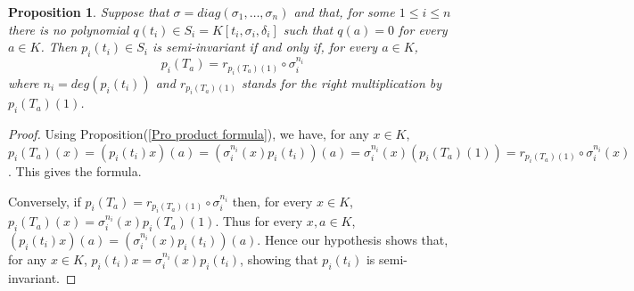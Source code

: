 \documentclass[12pt,a4paper]{article}
\newtheorem{proposition}[theorem]{Proposition}
\newtheorem{remarks}[theorem]{Remarks}
\newcommand{\de}{\delta}
\newcommand{\si}{\sigma}
\newcommand{\ut}{\underline{t}}
\begin{document}
		
	
	\begin{proposition} \label{Pro semi invarent and right multiplication}
				Suppose that $\sigma=diag(\sigma_1,\dots, \sigma_n)$ and that, for some $1\le i \le n$ there is no polynomial $q(t_i)\in S_i=K[t_i,\sigma_i,\delta_i]$ such that $q(a)=0$ for every $a\in K$.  Then $p_i(t_i)\in S_i$ is semi-invariant if and only if, for every $a\in K$,  
		$$
		p_i(T_a)=r_{p_i(T_a)(1)}\circ \sigma_i^{n_i}
		$$
		where $n_i=deg (p_i(t_i))$ and $r_{p_i(T_a)(1)}$ stands for the right multiplication by $p_i(T_a)(1)$.
	\end{proposition}
	\begin{proof}
		Using Proposition(\ref{Pro product formula}), we have, for any $x\in K$, $p_i(T_a)(x)= 
		(p_i(t_i)x)(a)=(\sigma_i^{n_i}(x)p_i(t_i))(a)
		=\sigma_i^{n_i}(x)(p_i(T_a)(1))=r_{p_i(T_a)(1)}\circ \sigma_i^{n_i}(x)$.  This gives the formula.
		
		Conversely, if $	p_i(T_a)=r_{p_i(T_a)(1)}\circ \sigma_i^{n_i}$ then, for every $x\in K$, $p_i(T_a)(x)=\sigma_i^{n_i}(x)p_i(T_a)(1)$.
		Thus for every $x,a\in K$, $(p_i(t_i)x)(a)= (\sigma_i^{n_i}(x)p_i(t_i))(a)$.  Hence our hypothesis shows that, for any $x\in K$, $p_i(t_i)x=\sigma_i^{n_i}(x)p_i(t_i)$, showing that $p_i(t_i)$ is semi-invariant.
	\end{proof}
	
\end{document}
